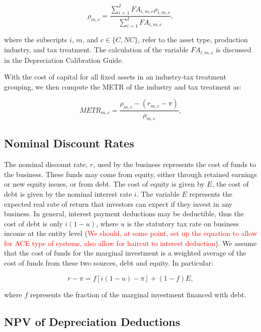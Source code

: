 \documentclass[article,11pt,letterpaper,fleqn]{article}
\theoremstyle{definition}
\numberwithin{equation}{section}
\begin{document}
\begin{equation}
\rho_{m,c} = \frac{\sum_{i=1}^{I}FA_{i,m,c}\rho_{i,m,c}}{\sum_{i=1}^{I}FA_{i,m,c}} ,
\end{equation}

\noindent\noindent where the subscripts $i$, $m$, and $c\in\{C,NC\}$, refer to the asset type, production industry, and tax treatment.  The calculation of the variable $FA_{i,m,c}$ is discussed in the Depreciation Calibration Guide.

With the cost of capital for all fixed assets in an industry-tax treatment grouping, we then compute the METR of the industry and tax treatment as:

\begin{equation}
METR_{m,c} =  \frac{\rho_{m,c} - (r_{m,c}-\pi)}{\rho_{m,c}},
\end{equation}

\subsection{Nominal Discount Rates}

The nominal discount rate, $r$, used by the business represents the cost of funds to the business.  These funds may come from equity, either through retained earnings or new equity issues, or from debt.  The cost of equity is given by $E$, the cost of debt is given by the nominal interest rate $i$.  The variable $E$ represents the expected real rate of return that investors can expect if they invest in any business.  In general, interest payment deductions may be deductible, thus the cost of debt is only $i(1-u)$, where $u$ is the statutory tax rate on business income at the entity level (\textcolor{red}{We should, at some point, set up the equation to allow for ACE type of systems, also allow for haircut to interest deduction}).  We assume that the cost of funds for the marginal investment is a weighted average of the cost of funds from these two sources, debt and equity.  In particular:

\begin{equation}
r-\pi = f\left[i(1-u)-\pi\right] + (1-f)E,
\end{equation}

\noindent\noindent where $f$ represents the fraction of the marginal investment financed with debt.

\subsection{NPV of Depreciation Deductions}
\end{document}
